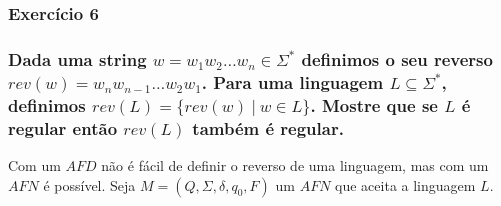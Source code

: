 \subsubsection{Exercício 6}

\subsubsection*{Dada uma string $w = w_1w_2 \hdots w_n \in \Sigma^{*}$ definimos o seu reverso $rev(w) = w_nw_{n-1} \hdots w_2w_1$. Para uma linguagem $L \subseteq \Sigma^{*}$, definimos $rev(L) = \{rev(w) \ | \ w \in L\}$. Mostre que se $L$ é regular então $rev(L)$ também é regular.}

\begin{spacing}{1.5}

Com um $AFD$ não é fácil de definir o reverso de uma linguagem, mas com um $AFN$ é possível. Seja $M = (Q, \Sigma, \delta, q_0, F)$ um $AFN$ que aceita a linguagem $L$. 


\end{spacing}